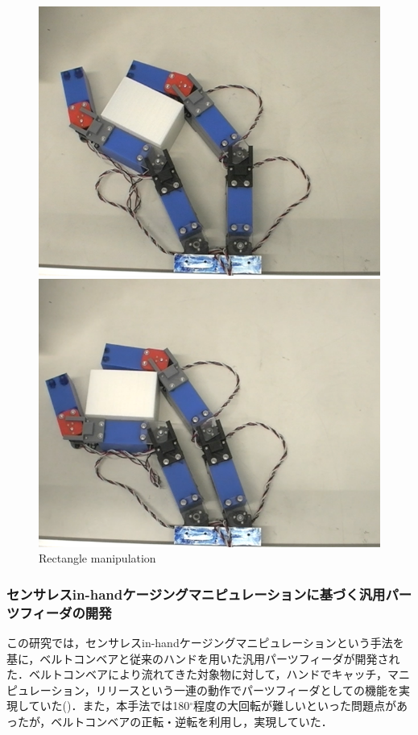 \documentclass[a4paper,twoside,12pt,papersize, dvipdfmx]{iirthesis}
\begin{document}
\begin{figure}[b]
\begin{minipage}{0.24\hsize}
\includegraphics[width=\hsize]{fig/1-introduction/komiyama/mani7.png}
\subcaption{}
\end{minipage}\hfill
\begin{minipage}{0.24\hsize}
\centering
\includegraphics[width=\hsize]{fig/1-introduction/komiyama/mani8.png}
\subcaption{}
\end{minipage}
\caption{Rectangle manipulation \cite{komiyama2021}}
\label{fig::intro::recmani}
\end{figure}

\subsubsection{センサレスin-handケージングマニピュレーションに基づく汎用パーツフィーダの開発 \cite{kamikukita2022}}
この研究では，センサレスin-handケージングマニピュレーションという手法を基に，ベルトコンベアと従来のハンドを用いた汎用パーツフィーダが開発された．ベルトコンベアにより流れてきた対象物に対して，ハンドでキャッチ，マニピュレーション，リリースという一連の動作でパーツフィーダとしての機能を実現していた()．また，本手法では180$^\circ$程度の大回転が難しいといった問題点があったが，ベルトコンベアの正転・逆転を利用し，実現していた．
\end{document}
